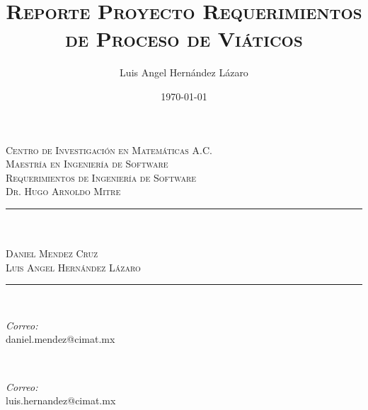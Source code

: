\documentclass{report}
\title{\textsc{Reporte Proyecto Requerimientos de Proceso de Viáticos}}
\author{Luis Angel Hernández Lázaro}
\date{\today}
\makeatletter
\let\thetitle\@title
\makeatother
\begin{document}

\begin{titlepage}
	\centering
    \vspace*{0.5 cm}
    
    
    \begin{figure}
		\centering
	\end{figure}
    \textsc{\LARGE Centro de Investigación en Matemáticas A.C.}\\[1.0 cm]
	\textsc{\Large Maestría en Ingeniería de Software}\\[0.5 cm]
	\textsc{\large Requerimientos de Ingeniería de Software\\Dr. Hugo Arnoldo Mitre}\\[0.5 cm]
	\rule{\linewidth}{0.2 mm} \\[0.4 cm]
	{ \huge \bfseries \thetitle}\\ \textsc{\large Daniel Mendez Cruz\\ Luis Angel Hernández Lázaro}
	\rule{\linewidth}{0.2 mm} \\[1.5 cm]
	
	\begin{minipage}{0.5\textwidth}
		\begin{flushleft} \large
			\emph{Correo:}\\
			daniel.mendez@cimat.mx
		\end{flushleft}
	\end{minipage}~
	\begin{minipage}{0.4\textwidth}
		\begin{flushright} \large
			\emph{Correo:} \\
			luis.hernandez@cimat.mx
		\end{flushright}
	\end{minipage}\\[2 cm]
		

\end{titlepage}
\end{document}
